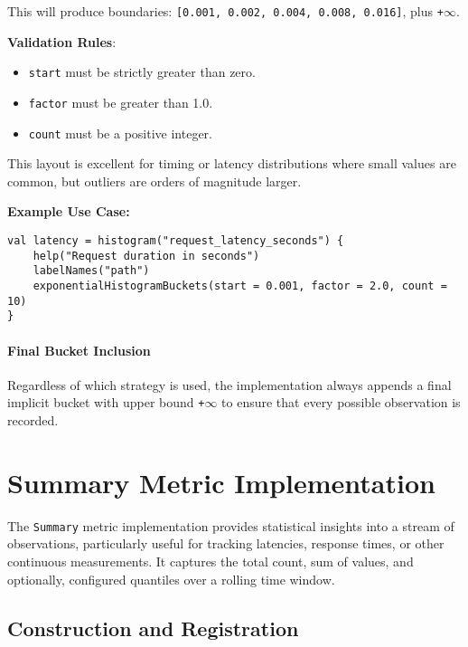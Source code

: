 This will produce boundaries:
\texttt{[0.001, 0.002, 0.004, 0.008, 0.016]}, plus \texttt{+\(\infty\)}.

\textbf{Validation Rules}:
\begin{itemize}
    \item \texttt{start} must be strictly greater than zero.
    \item \texttt{factor} must be greater than 1.0.
    \item \texttt{count} must be a positive integer.
\end{itemize}

This layout is excellent for timing or latency distributions where small values are common, but outliers are orders of magnitude larger.

\vspace{0.5em}
\noindent
\textbf{Example Use Case:}
\begin{verbatim}
val latency = histogram("request_latency_seconds") {
    help("Request duration in seconds")
    labelNames("path")
    exponentialHistogramBuckets(start = 0.001, factor = 2.0, count = 10)
}
\end{verbatim}

\paragraph{Final Bucket Inclusion}

Regardless of which strategy is used, the implementation always appends a final implicit bucket with upper bound \texttt{+\(\infty\)} to ensure that every possible observation is recorded.






\section{Summary Metric Implementation}

The \texttt{Summary} metric implementation provides statistical insights into a stream of observations, particularly useful for tracking latencies, response times, or other continuous measurements. It captures the total count, sum of values, and optionally, configured quantiles over a rolling time window.

\subsection{Construction and Registration}

